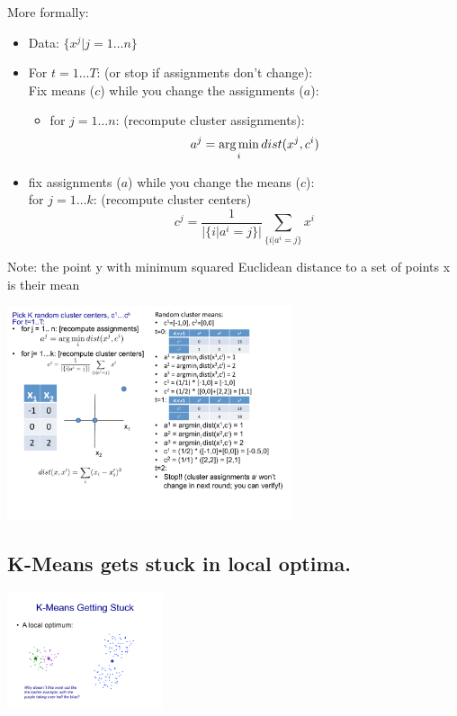 More formally: 
\begin{itemize}
	\item Data: $\{ x^j | j = 1 \dots n \}$
	\item For $ t = 1 \dots T$:  (or stop if assignments don't change): \hfill \\
		Fix means ($c$) while you change the assignments ($a$): \hfill \\
		\begin{itemize}
			
			\item for $ j = 1 \dots n$: (recompute cluster assignments):
				$$ a^j = \operatorname*{arg\,min}_i dist(x^j, c^i)  $$ 
		\end{itemize}
	\item fix assignments ($a$) while you change the means ($c$): \hfill \\
		for $j = 1 \dots k$: (recompute cluster centers)
		$$ c^j = \frac{1}{|\{ i | a^i = j \}|}  \sum_{\{ i | a^i = j \}} x^i$$
\end{itemize}
Note:  the point y with minimum squared Euclidean distance to a set of points {x} is their mean

\includegraphics[width=3.3in]{figures/kmeans_algorithm_example.pdf}

\subsection{K-Means gets stuck in local optima.}

\includegraphics[width=1.8in]{figures/k-means_gets_stuck.pdf}
